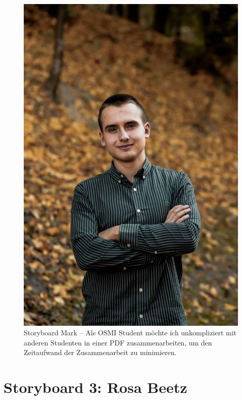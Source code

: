 \documentclass{article}
\begin{document}
\begin{figure}[h]
	\includegraphics[angle=90,width=\textwidth]{mark}
	\centering
	\caption{Storyboard Mark – Als OSMI Student möchte ich unkompliziert mit anderen Studenten in einer PDF zusammenarbeiten, um den Zeitaufwand der Zusammenarbeit zu minimieren.}
\end{figure}

\newpage

\section{Storyboard 3: Rosa Beetz}
\end{document}
